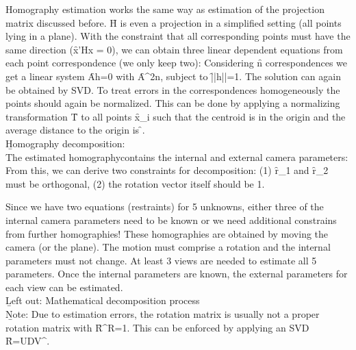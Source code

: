 Homography estimation works the same way as estimation of the projection matrix discussed before. \f{H} is even a projection in a simplified setting (all points lying in a plane). With the constraint that all corresponding points must have the same direction
(\f{x'\times Hx = 0}), 
we can obtain three linear dependent equations from each point correspondence (we only keep two):
Considering \f{n} correspondences we get a linear system \f{Ah=0} with \f{A\in{}^{2n}}, subject to \f{||h||=1}. The solution can again be obtained by SVD. To treat errors in the correspondences homogeneously the points should again be normalized. This can be done by applying a normalizing transformation \f{T} to all points \f{x_i} such that the centroid is in the origin and the average distance to the origin is \f{}.\\

\b{Homography decomposition:\\[0.5em]}
The estimated homographycontains the internal and external camera parameters:
From this, we can derive two constraints for decomposition: (1) \f{r_1} and \f{r_2} must be orthogonal, (2) the rotation vector itself should be 1.
\newpage

Since we have two equations (restraints) for 5 unknowns, either three of the internal camera parameters need to be known or we need additional constrains from further homographies! These homographies are obtained by moving the camera (or the plane). The motion must comprise a rotation and the internal parameters must not change. At least 3 views are needed to estimate all 5 parameters. Once the internal parameters are known, the external parameters for each view can be estimated.\\

\b{Left out: Mathematical decomposition process}\\

\b{Note:} Due to estimation errors, the rotation matrix is usually not a proper rotation matrix with \f{R^\top R=1}. This can be enforced by applying an SVD \f{R=UDV^\top}.

